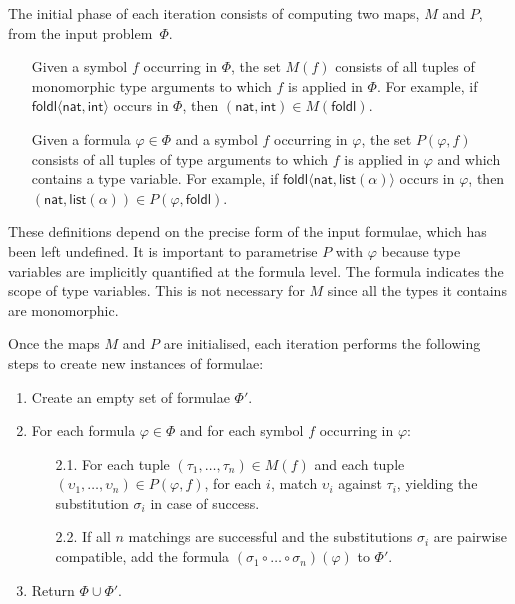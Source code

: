 \documentclass[]{ceurart}
\newcommand\ty[1]{\textsf{#1}}
\newcommand\sym[1]{\textsf{#1}}
\begin{document}
The initial phase of each iteration consists of computing two maps, \(M\) and \(P\), from the input problem~$\Phi$.
%
\begin{enumerate}
\item[\labelitemi] Given a symbol \(f\) occurring in \(\Phi\), the set \(M(f)\) consists of all tuples of monomorphic type arguments to which \(f\) is applied in \(\Phi\). For example, if \(\sym{foldl}\langle \ty{nat}, \ty{int}\rangle\) occurs in \(\Phi\), then \((\ty{nat}, \ty{int}) \in M(\sym{foldl}) \).

\item[\labelitemi] Given a formula \(\varphi \in \Phi\) and a symbol \(f\) occurring in \(\varphi\), the set \(P(\varphi, f)\) consists of all tuples of type arguments to which \(f\) is applied in \(\varphi\) and which contains a type variable. For example, if \(\sym{foldl}\langle \ty{nat}, \ty{list}(\alpha)\rangle\) occurs in \(\varphi\), then \((\ty{nat}, \ty{list}(\alpha)) \in P(\varphi, \sym{foldl}) \).
\end{enumerate}

These definitions depend on the precise form of the input formulae, which has been left undefined. It is important to parametrise \(P\) with \(\varphi\) because type variables are implicitly quantified at the formula level. The formula indicates the scope of type variables. This is not necessary for \(M\) since all the types it contains are monomorphic.

Once the maps \(M\) and \(P\) are initialised, each iteration performs the following steps to create new instances of formulae:

\begin{enumerate}

   \item Create an empty set of formulae \(\Phi'\).

   \item For each formula \(\varphi \in \Phi\) and for each symbol \(f\) occurring in \(\varphi\):
   \begin{enumerate}
    \item[2.1.] For each tuple \((\tau_1, \dots, \tau_n) \in  M(f)\)        and each tuple \((\upsilon_1, \dots, \upsilon_n) \in P(\varphi, f)\),
     for each \(i\), match \(\upsilon_i\) against \(\tau_i\), yielding the substitution \(\sigma_i\) in case of success.

    \item[2.2.] If all \(n\) matchings are successful and the substitutions \(\sigma_i\) are pairwise compatible,
add the formula \((\sigma_1 \circ \dots \circ \sigma_n)(\varphi)\) to \(\Phi'\).
   \end{enumerate}

   \item Return \(\Phi \cup \Phi'\).

\end{enumerate}
\end{document}
